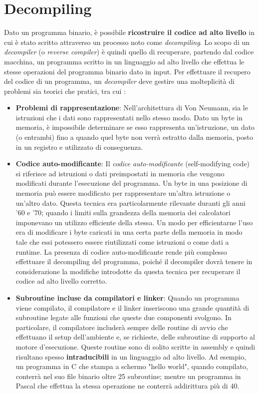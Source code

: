 \documentclass[../main.tex]{subfiles}
\begin{document}
\section{Decompiling}
Dato un programma binario, è possibile \textbf{ricostruire il codice ad alto livello} in cui è stato scritto attraverso un processo noto come \textit{decompiling}.
Lo scopo di un \textit{decompiler} (o \textit{reverse compiler}) è quindi quello di recuperare, partendo dal codice macchina, un programma scritto in un linguaggio ad alto livello che effettua le stesse
operazioni del programma binario dato in input. Per effettuare il recupero del codice di un programma, un \textit{decompiler} deve gestire una molteplicità di problemi sia teorici che pratici, tra cui \cite{Cifuentes1994ReverseCT}:
\begin{itemize}
    \item \textbf{Problemi di rappresentazione}: Nell'architettura di Von Neumann, sia le istruzioni che i dati sono rappresentati nello stesso modo. Dato un byte in memoria, è impossibile determinare se esso rappresenta un'istruzione, un dato (o entrambi) fino a quando quel byte non verrà estratto dalla memoria, posto in un registro e utilizzato di conseguenza.
    \item \textbf{Codice auto-modificante}: Il \textit{codice auto-modificante} (self-modifying code) si riferisce ad istruzioni o dati preimpostati in memoria che vengono modificati durante l'esecuzione del programma. Un byte in una posizione di memoria può essere modificato per rappresentare un'altra istruzione o un'altro dato. Questa tecnica era particolarmente rilevante duranti gli anni '60 e '70; quando
    i limiti sulla grandezza della memoria dei calcolatori imponevano un utilizzo efficiente della stessa. Un modo per efficientarne l'uso era di modificare i byte caricati in una certa parte della memoria in modo tale che essi potessero essere riutilizzati come istruzioni o come dati a runtime. La presenza di codice auto-modificante rende più complesso effettuare il decompiling del programma, poiché il decompiler
    dovrà tenere in considerazione la modifiche introdotte da questa tecnica per recuperare il codice ad alto livello corretto.
    \item \textbf{Subroutine incluse da compilatori e linker}: Quando un programma viene compilato, il compilatore e il linker inseriscono una grande quantità di subroutine legate alle funzioni che queste due componenti svolgono.
    In particolare, il compilatore includerà sempre delle routine di avvio che effettuano il setup dell'ambiente e, se richieste, delle subroutine di supporto al motore d'esecuzione. 
    Queste routine sono di solito scritte in assembly e quindi risultano spesso \textbf{intraducibili} in un linguaggio ad alto livello. 
    Ad esempio, un programma in C che stampa a schermo "hello world", quando compilato, conterrà nel suo file binario oltre 25 subroutine; 
    mentre un programma in Pascal che effettua la stessa operazione ne conterrà addirittura più di 40.
\end{itemize}
\end{document}
